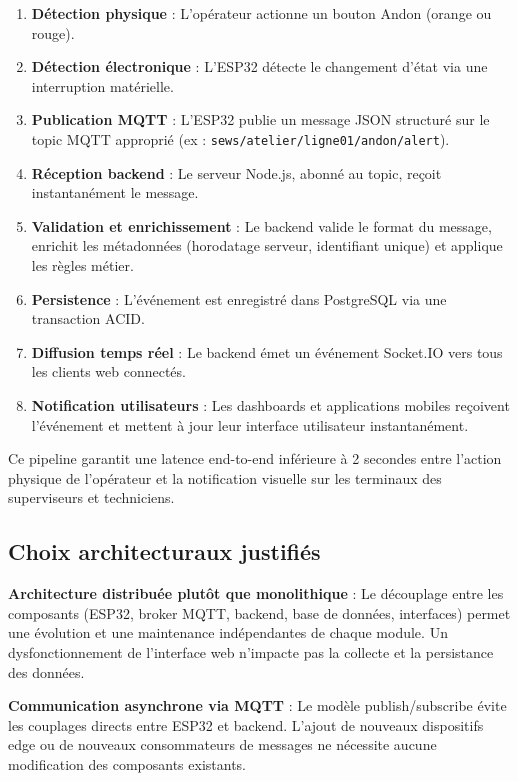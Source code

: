 \begin{enumerate}
    \item \textbf{Détection physique} : L'opérateur actionne un bouton Andon (orange ou rouge).
    \item \textbf{Détection électronique} : L'ESP32 détecte le changement d'état via une interruption matérielle.
    \item \textbf{Publication MQTT} : L'ESP32 publie un message JSON structuré sur le topic MQTT approprié (ex : \texttt{sews/atelier/ligne01/andon/alert}).
    \item \textbf{Réception backend} : Le serveur Node.js, abonné au topic, reçoit instantanément le message.
    \item \textbf{Validation et enrichissement} : Le backend valide le format du message, enrichit les métadonnées (horodatage serveur, identifiant unique) et applique les règles métier.
    \item \textbf{Persistence} : L'événement est enregistré dans PostgreSQL via une transaction ACID.
    \item \textbf{Diffusion temps réel} : Le backend émet un événement Socket.IO vers tous les clients web connectés.
    \item \textbf{Notification utilisateurs} : Les dashboards et applications mobiles reçoivent l'événement et mettent à jour leur interface utilisateur instantanément.
\end{enumerate}

Ce pipeline garantit une latence end-to-end inférieure à 2 secondes entre l'action physique de l'opérateur et la notification visuelle sur les terminaux des superviseurs et techniciens.


\subsection{Choix architecturaux justifiés}

\textbf{Architecture distribuée plutôt que monolithique} : Le découplage entre les composants (ESP32, broker MQTT, backend, base de données, interfaces) permet une évolution et une maintenance indépendantes de chaque module. Un dysfonctionnement de l'interface web n'impacte pas la collecte et la persistance des données.

\textbf{Communication asynchrone via MQTT} : Le modèle publish/subscribe évite les couplages directs entre ESP32 et backend. L'ajout de nouveaux dispositifs edge ou de nouveaux consommateurs de messages ne nécessite aucune modification des composants existants.

